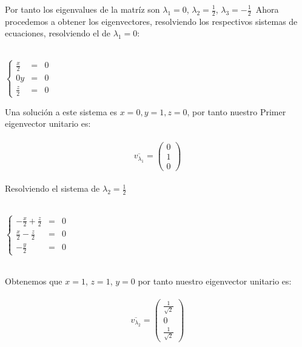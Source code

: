 \documentclass[11pt,letterpaper]{article}
\begin{document}
    Por tanto los eigenvalues de la matr\'iz son $\lambda_1=0$, $\lambda_2=\frac{1}{2}$, $\lambda_3=-\frac{1}{2}$\,
    Ahora procedemos a obtener los eigenvectores, resolviendo los respectivos sistemas de ecuaciones, resolviendo
    el de $\lambda_1=0$:\,\\
    \,\\
   \begin{center}
     $\left\{ 
         \begin{array}{rcl}
            \frac{x}{2}&=&0\\
            0y&=&0\\
            \frac{z}{2}&=&0
         \end{array}
       \right.$\,\\
        \end{center}
    Una soluci\'on a este sistema es $x=0,y=1,z=0$, por tanto nuestro Primer
    eigenvector unitario es:\,\\
    \,\\
    \begin{equation*}
        \overline{v_{\lambda_1}}=  
        \begin{pmatrix}
                0 \\
                1\\
                0
                \end{pmatrix}
    \end{equation*}\,\\
    Resolviendo el sistema de $\lambda_2=\frac{1}{2}$\,\\
    \,\\
   \begin{center}
     $\left\{ 
         \begin{array}{rcl}
            -\frac{x}{2}+\frac{z}{2}&=&0\\
            \frac{x}{2}-\frac{z}{2}&=&0\\
            -\frac{y}{2}&=&0
         \end{array}
       \right.$\,\\
        \end{center}
    \,\\
    Obtenemos que $x=1$, $z=1$, $y=0$ por tanto
    nuestro eigenvector unitario es:\,\\
    \,\\
    \begin{equation*}
        \overline{v_{\lambda_2}}=\begin{pmatrix}
                \frac{1}{\sqrt{2}}\\
                0\\
                \frac{1}{\sqrt{2}}
                \end{pmatrix}
    \end{equation*}\,\\
\end{document}
